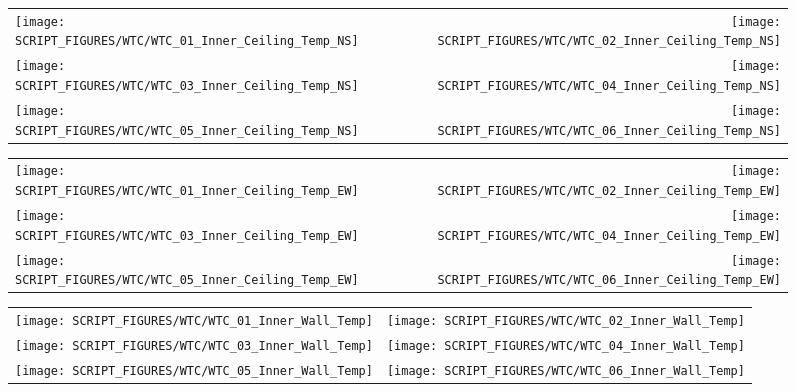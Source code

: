 \begin{figure}[p]
\begin{tabular*}{\textwidth}{l@{\extracolsep{\fill}}r}
\texttt{[image: SCRIPT\_FIGURES/WTC/WTC\_01\_Inner\_Ceiling\_Temp\_NS]} &
\texttt{[image: SCRIPT\_FIGURES/WTC/WTC\_02\_Inner\_Ceiling\_Temp\_NS]} \\
\texttt{[image: SCRIPT\_FIGURES/WTC/WTC\_03\_Inner\_Ceiling\_Temp\_NS]} &
\texttt{[image: SCRIPT\_FIGURES/WTC/WTC\_04\_Inner\_Ceiling\_Temp\_NS]} \\
\texttt{[image: SCRIPT\_FIGURES/WTC/WTC\_05\_Inner\_Ceiling\_Temp\_NS]} &
\texttt{[image: SCRIPT\_FIGURES/WTC/WTC\_06\_Inner\_Ceiling\_Temp\_NS]}
\end{tabular*}
\label{NIST_WTC_Inner_Ceiling_NS}
\end{figure}

\begin{figure}[p]
\begin{tabular*}{\textwidth}{l@{\extracolsep{\fill}}r}
\texttt{[image: SCRIPT\_FIGURES/WTC/WTC\_01\_Inner\_Ceiling\_Temp\_EW]} &
\texttt{[image: SCRIPT\_FIGURES/WTC/WTC\_02\_Inner\_Ceiling\_Temp\_EW]} \\
\texttt{[image: SCRIPT\_FIGURES/WTC/WTC\_03\_Inner\_Ceiling\_Temp\_EW]} &
\texttt{[image: SCRIPT\_FIGURES/WTC/WTC\_04\_Inner\_Ceiling\_Temp\_EW]} \\
\texttt{[image: SCRIPT\_FIGURES/WTC/WTC\_05\_Inner\_Ceiling\_Temp\_EW]} &
\texttt{[image: SCRIPT\_FIGURES/WTC/WTC\_06\_Inner\_Ceiling\_Temp\_EW]}
\end{tabular*}
\label{NIST_WTC_Inner_Ceiling_EW}
\end{figure}

\begin{figure}[p]
\begin{tabular*}{\textwidth}{l@{\extracolsep{\fill}}r}
\texttt{[image: SCRIPT\_FIGURES/WTC/WTC\_01\_Inner\_Wall\_Temp]} &
\texttt{[image: SCRIPT\_FIGURES/WTC/WTC\_02\_Inner\_Wall\_Temp]} \\
\texttt{[image: SCRIPT\_FIGURES/WTC/WTC\_03\_Inner\_Wall\_Temp]} &
\texttt{[image: SCRIPT\_FIGURES/WTC/WTC\_04\_Inner\_Wall\_Temp]} \\
\texttt{[image: SCRIPT\_FIGURES/WTC/WTC\_05\_Inner\_Wall\_Temp]} &
\texttt{[image: SCRIPT\_FIGURES/WTC/WTC\_06\_Inner\_Wall\_Temp]}
\end{tabular*}
\label{NIST_WTC_Inner_Wall}
\end{figure}

